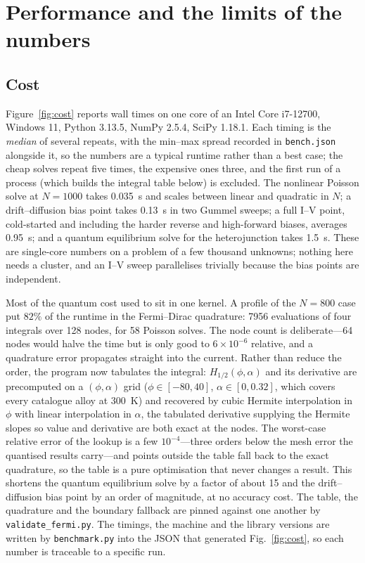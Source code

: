 \documentclass[preprint,12pt]{elsarticle}
\begin{document}
\section{Performance and the limits of the numbers}
\label{sec:performance}

\subsection{Cost}

Figure~\ref{fig:cost} reports wall times on one core of an Intel Core
i7-12700, Windows 11, Python 3.13.5, NumPy 2.5.4, SciPy 1.18.1. Each timing
is the \emph{median} of several repeats, with the min--max spread recorded in
\texttt{bench.json} alongside it, so the numbers are a typical runtime rather
than a best case; the cheap solves repeat five times, the expensive ones
three, and the first run of a process (which builds the integral table below)
is excluded. The nonlinear
Poisson solve at $N=1000$ takes \SI{0.035}{s} and scales between linear and
quadratic in $N$; a drift--diffusion bias point takes \SI{0.13}{s} in two
Gummel sweeps; a full I--V point, cold-started and including the harder reverse
and high-forward biases, averages \SI{0.95}{s}; and a quantum equilibrium solve
for the heterojunction takes \SI{1.5}{s}. These are single-core numbers on a
problem of a few thousand unknowns; nothing here needs a cluster, and an I--V
sweep parallelises trivially because the bias points are independent.

Most of the quantum cost used to sit in one kernel. A profile of the $N=800$
case put $82\%$ of the runtime in the Fermi--Dirac quadrature: 7956
evaluations of four integrals over 128 nodes, for 58 Poisson solves. The node
count is deliberate---64 nodes would halve the time but is only good to
$6\times10^{-6}$ relative, and a quadrature error propagates straight into the
current. Rather than reduce the order, the program now tabulates the integral:
$H_{1/2}(\phi,\alpha)$ and its derivative are precomputed on a
$(\phi,\alpha)$ grid ($\phi\in[-80,40]$, $\alpha\in[0,0.32]$, which covers
every catalogue alloy at \SI{300}{K}) and recovered by cubic Hermite
interpolation in $\phi$ with linear interpolation in $\alpha$, the tabulated
derivative supplying the Hermite slopes so value and derivative are both exact
at the nodes. The worst-case relative error of the lookup is a few
$10^{-4}$---three orders below the mesh error the quantised results carry---and
points outside the table fall back to the exact quadrature, so the table is a
pure optimisation that never changes a result. This shortens the quantum
equilibrium solve by a factor of about 15 and the drift--diffusion bias point
by an order of magnitude, at no accuracy cost. The table, the quadrature and
the boundary fallback are pinned against one another by
\texttt{validate\_fermi.py}. The timings, the machine and the library versions
are written by \texttt{benchmark.py} into the JSON that generated
Fig.~\ref{fig:cost}, so each number is traceable to a specific run.
\end{document}

